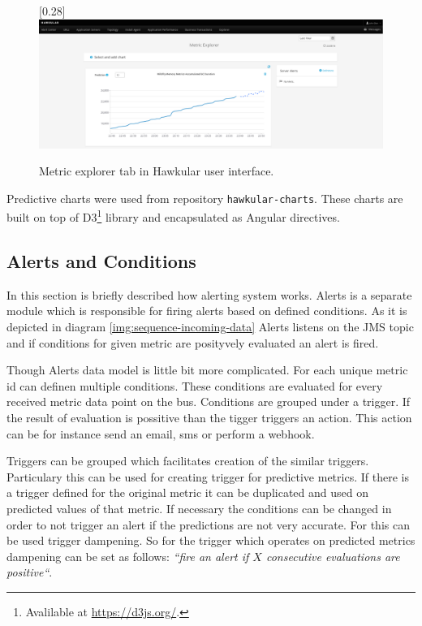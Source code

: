         \begin{figure}[H]
            \begin{center}
                \scalebox{0.185}[0.28]{\includegraphics[angle=0]{img/hawkular-explorer.pdf}}
                \caption{Metric explorer tab in Hawkular user interface.}
                \label{img:hawkular-explorer}
            \end{center}
        \end{figure}

        Predictive charts were used from repository \texttt{hawkular-charts}. These charts are built on top of
        D3\footnote{Avalilable at \url{https://d3js.org/}.} library and encapsulated as Angular directives.

        \subsection{Alerts and Conditions}
        In this section is briefly described how alerting system works. Alerts is a separate module
        which is responsible for firing alerts based on defined conditions. As it is depicted in diagram
        \ref{img:sequence-incoming-data} Alerts listens on the JMS topic and if conditions for given metric are
        posityvely evaluated an alert is fired.

        Though Alerts data model is little bit more complicated. For each unique metric id can definen multiple
        conditions. These conditions are evaluated for every received metric data point on the bus. Conditions are
        grouped under a trigger. If the result of evaluation is possitive than the tigger triggers an action. This
        action can be for instance send an email, sms or perform a webhook.

        Triggers can be grouped which facilitates creation of the similar triggers. Particulary this can be used for
        creating trigger for predictive metrics. If there is a trigger defined for the original metric it can be
        duplicated and used on predicted values of that metric. If necessary the conditions can be changed in
        order to not trigger an alert if the predictions are not very accurate. For this can be used trigger dampening.
        So for the trigger which operates on predicted metrics dampening can be set as follows: \emph{``fire an alert if
        $X$ consecutive evaluations are positive``}.

